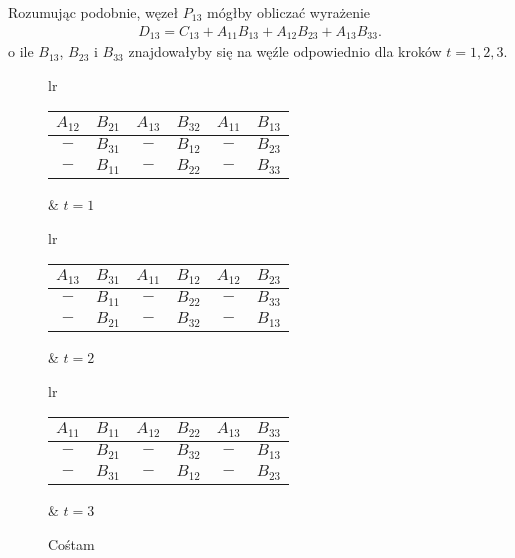 Rozumując podobnie, węzeł \(P_{13}\) mógłby obliczać wyrażenie
\begin{align*}
D_{13} = C_{13} + A_{11}B_{13} + A_{12}B_{23} + A_{13}B_{33}.
\end{align*}
\noindent o ile \(B_{13}\), \(B_{23}\) i \(B_{33}\) znajdowałyby się na węźle odpowiednio dla kroków \(t=1, 2, 3\).
\begin{figure}[h]
\centering
\begin{tabular}{lr}
\begin{tabular}{|cc|cc|cc|}
\hline
\(A_{12}\) & \(B_{21}\) & \(A_{13}\) & \(B_{32}\) & \(A_{11}\) & \(B_{13}\) \\
\hline
\(-\) & \(B_{31}\) & \(-\) & \(B_{12}\) & \(-\) & \(B_{23}\) \\
\hline
\(-\) & \(B_{11}\) & \(-\) & \(B_{22}\) & \(-\) & \(B_{33} \) \\
\hline
\end{tabular} &
\hspace{1cm}\(t=1\)
\end{tabular}

\vspace{0.5cm}

\begin{tabular}{lr}
\begin{tabular}{|cc|cc|cc|}
\hline
\(A_{13}\) & \(B_{31}\) & \(A_{11}\) & \(B_{12}\) & \(A_{12}\) & \(B_{23}\) \\
\hline
\(-\) & \(B_{11}\) & \(-\) & \(B_{22}\) & \(-\) & \(B_{33}\) \\
\hline
\(-\) & \(B_{21}\) & \(-\) & \(B_{32}\) & \(-\) & \(B_{13} \) \\
\hline
\end{tabular} &
\hspace{1cm}\(t=2\)
\end{tabular}

\vspace{0.5cm}

\begin{tabular}{lr}
\begin{tabular}{|cc|cc|cc|}
\hline
\(A_{11}\) & \(B_{11}\) & \(A_{12}\) & \(B_{22}\) & \(A_{13}\) & \(B_{33}\) \\
\hline
\(-\) & \(B_{21}\) & \(-\) & \(B_{32}\) & \(-\) & \(B_{13}\) \\
\hline
\(-\) & \(B_{31}\) & \(-\) & \(B_{12}\) & \(-\) & \(B_{23} \) \\
\hline
\end{tabular} &
\hspace{1cm}\(t=3\)
\end{tabular}
\caption{Cośtam}
\end{figure}





